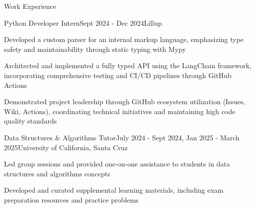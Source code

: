 \documentclass{resume}
\begin{document}
\begin{rSection}{Work Experience}

	\begin{rSubsection}{Python Developer Intern}{Sept 2024 - Dec 2024}{Lillup}{}
		\item Developed a custom parser for an internal markup language, emphasizing type safety and maintainability through static typing with Mypy
		\item Architected and implemented a fully typed API using the LangChain framework, incorporating comprehensive testing and CI/CD pipelines through GitHub Actions
		\item Demonstrated project leadership through GitHub ecosystem utilization (Issues, Wiki, Actions), coordinating technical initiatives and maintaining high code quality standards
	\end{rSubsection}

	\begin{rSubsection}{Data Structures \& Algorithms Tutor}{July 2024 - Sept 2024, Jan 2025 - March 2025}{University of California, Santa Cruz}{}
		\item Led group sessions and provided one-on-one assistance to students in data structures and algorithms concepts
		\item Developed and curated supplemental learning materials, including exam preparation resources and practice problems
	\end{rSubsection}

\end{rSection}
\end{document}
